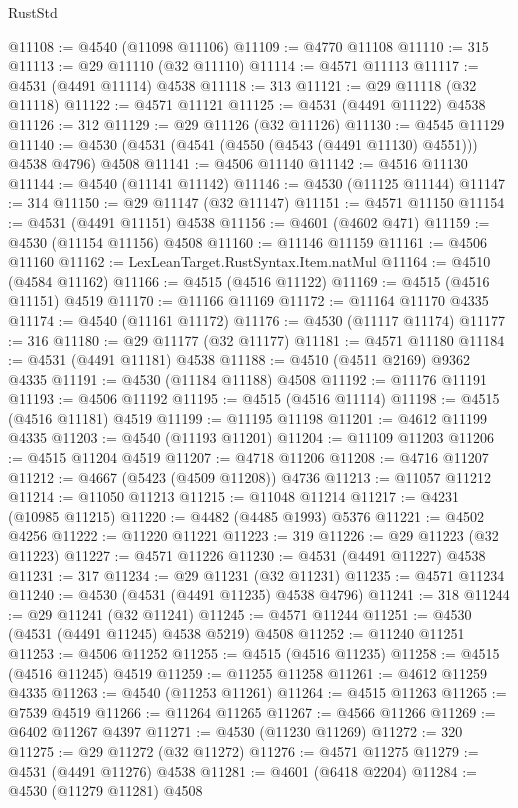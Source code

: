 \begin{lexlean}{RustStd}
\begin{coremodule}
{\begin{coremodule}
{{{{{{{{{{{{{{{{{{{{{{{{{{{{{{{{{{{{{{{{{{{{{{{{{{{{{{{@11108 := @4540 (@11098 @11106)
@11109 := @4770 @11108
@11110 := 315
@11113 := @29 @11110 (@32 @11110)
@11114 := @4571 @11113
@11117 := @4531 (@4491 @11114) @4538
@11118 := 313
@11121 := @29 @11118 (@32 @11118)
@11122 := @4571 @11121
@11125 := @4531 (@4491 @11122) @4538
@11126 := 312
@11129 := @29 @11126 (@32 @11126)
@11130 := @4545 @11129
@11140 := @4530 (@4531 (@4541 (@4550 (@4543 (@4491 @11130) @4551))) @4538 @4796) @4508
@11141 := @4506 @11140
@11142 := @4516 @11130
@11144 := @4540 (@11141 @11142)
@11146 := @4530 (@11125 @11144)
@11147 := 314
@11150 := @29 @11147 (@32 @11147)
@11151 := @4571 @11150
@11154 := @4531 (@4491 @11151) @4538
@11156 := @4601 (@4602 @471)
@11159 := @4530 (@11154 @11156) @4508
@11160 := @11146 @11159
@11161 := @4506 @11160
@11162 := LexLeanTarget.RustSyntax.Item.natMul
@11164 := @4510 (@4584 @11162)
@11166 := @4515 (@4516 @11122)
@11169 := @4515 (@4516 @11151) @4519
@11170 := @11166 @11169
@11172 := @11164 @11170 @4335
@11174 := @4540 (@11161 @11172)
@11176 := @4530 (@11117 @11174)
@11177 := 316
@11180 := @29 @11177 (@32 @11177)
@11181 := @4571 @11180
@11184 := @4531 (@4491 @11181) @4538
@11188 := @4510 (@4511 @2169) @9362 @4335
@11191 := @4530 (@11184 @11188) @4508
@11192 := @11176 @11191
@11193 := @4506 @11192
@11195 := @4515 (@4516 @11114)
@11198 := @4515 (@4516 @11181) @4519
@11199 := @11195 @11198
@11201 := @4612 @11199 @4335
@11203 := @4540 (@11193 @11201)
@11204 := @11109 @11203
@11206 := @4515 @11204 @4519
@11207 := @4718 @11206
@11208 := @4716 @11207
@11212 := @4667 (@5423 (@4509 @11208)) @4736
@11213 := @11057 @11212
@11214 := @11050 @11213
@11215 := @11048 @11214
@11217 := @4231 (@10985 @11215)
@11220 := @4482 (@4485 @1993) @5376
@11221 := @4502 @4256
@11222 := @11220 @11221
@11223 := 319
@11226 := @29 @11223 (@32 @11223)
@11227 := @4571 @11226
@11230 := @4531 (@4491 @11227) @4538
@11231 := 317
@11234 := @29 @11231 (@32 @11231)
@11235 := @4571 @11234
@11240 := @4530 (@4531 (@4491 @11235) @4538 @4796)
@11241 := 318
@11244 := @29 @11241 (@32 @11241)
@11245 := @4571 @11244
@11251 := @4530 (@4531 (@4491 @11245) @4538 @5219) @4508
@11252 := @11240 @11251
@11253 := @4506 @11252
@11255 := @4515 (@4516 @11235)
@11258 := @4515 (@4516 @11245) @4519
@11259 := @11255 @11258
@11261 := @4612 @11259 @4335
@11263 := @4540 (@11253 @11261)
@11264 := @4515 @11263
@11265 := @7539 @4519
@11266 := @11264 @11265
@11267 := @4566 @11266
@11269 := @6402 @11267 @4397
@11271 := @4530 (@11230 @11269)
@11272 := 320
@11275 := @29 @11272 (@32 @11272)
@11276 := @4571 @11275
@11279 := @4531 (@4491 @11276) @4538
@11281 := @4601 (@6418 @2204)
@11284 := @4530 (@11279 @11281) @4508
}}}}}}}}}}}}}}}}}}}}}}}}}}}}}}}}}}}}}}}}}}}}}}}}}}}}}}}
\end{coremodule}}
\end{coremodule}
\end{lexlean}
